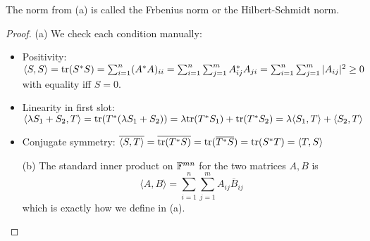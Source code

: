 \documentclass{extarticle}
\begin{document}
\begin{remark}
    The norm from (a) is called the Frbenius norm or the Hilbert-Schmidt norm.
\end{remark}

\begin{proof}
(a) We check each condition manually:
\begin{itemize}
    \item Positivity: \(\langle S,S \rangle = \text{tr} (S^*S) = \sum_{i=1}^{n} (A^*A)_{ii} 
    = \sum_{i=1}^{n} \sum_{j=1}^{m} A^*_{ij} A_{ji} 
    = \sum_{i=1}^{n} \sum_{j=1}^{m} |A_{ij}|^2 \geq 0\) with equality 
    iff \(S = 0\). 
    \item Linearity in first slot: \(\langle \lambda S_1 + S_2, T \rangle 
    = \text{tr} (T^* (\lambda S_1 + S_2)) 
    = \lambda\text{tr} (T^* S_1) + \text{tr} (T^* S_2) =\lambda \langle S_1,T \rangle + \langle S_2,T \rangle\)
    \item Conjugate symmetry: \( \overline{ \langle S,T \rangle } =\overline{\text{tr} (T^* S)}  
    = \text{tr} (\overline{T^* S}) = \text{tr} (S^* T) = \langle T,S \rangle\) 


    (b) The standard inner product on \(\mathbb{F}^{mn}\) for the two matrices \(A, B\) is 
    \[\langle A,B \rangle = \sum_{i=1}^{n} \sum_{j=1}^{m} A_{ij} \overline{B}_{ij}\] 
    which is exactly how we define in (a).
\end{itemize}
\end{proof}
\end{document}
